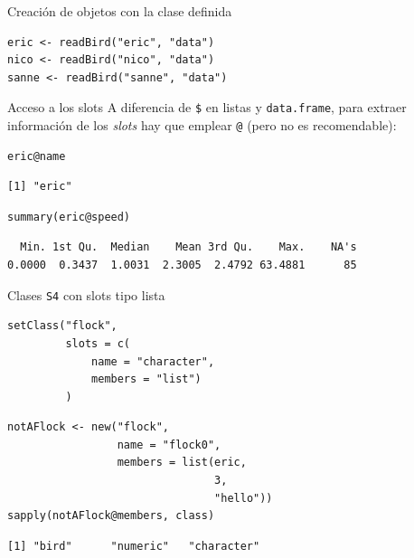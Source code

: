 \documentclass[xcolor={usenames,svgnames,dvipsnames}]{beamer}
\begin{document}
\begin{frame}[label={sec:orgb9a713a},fragile]{Creación de objetos con la clase definida}
 \lstset{language=r,label= ,caption= ,captionpos=b,numbers=none}
\begin{lstlisting}
eric <- readBird("eric", "data")
nico <- readBird("nico", "data")
sanne <- readBird("sanne", "data")
\end{lstlisting}
\end{frame}


\begin{frame}[label={sec:org1cd7eef},fragile]{Acceso a los slots}
 A diferencia de \texttt{\$} en listas y \texttt{data.frame}, para extraer información de los \emph{slots} hay que emplear \texttt{@} (pero no es recomendable):
\lstset{language=r,label= ,caption= ,captionpos=b,numbers=none}
\begin{lstlisting}
eric@name
\end{lstlisting}

\begin{verbatim}
[1] "eric"
\end{verbatim}


\lstset{language=r,label= ,caption= ,captionpos=b,numbers=none}
\begin{lstlisting}
summary(eric@speed)
\end{lstlisting}

\begin{verbatim}
  Min. 1st Qu.  Median    Mean 3rd Qu.    Max.    NA's 
0.0000  0.3437  1.0031  2.3005  2.4792 63.4881      85
\end{verbatim}
\end{frame}

\begin{frame}[label={sec:orgfd46b3b},fragile]{Clases \texttt{S4} con slots tipo lista}
 \lstset{language=r,label= ,caption= ,captionpos=b,numbers=none}
\begin{lstlisting}
setClass("flock",
         slots = c(
             name = "character",
             members = "list")
         )

\end{lstlisting}

\lstset{language=r,label= ,caption= ,captionpos=b,numbers=none}
\begin{lstlisting}
notAFlock <- new("flock",
                 name = "flock0",
                 members = list(eric,
                                3,
                                "hello"))
sapply(notAFlock@members, class)
\end{lstlisting}

\begin{verbatim}
[1] "bird"      "numeric"   "character"
\end{verbatim}
\end{frame}
\end{document}
